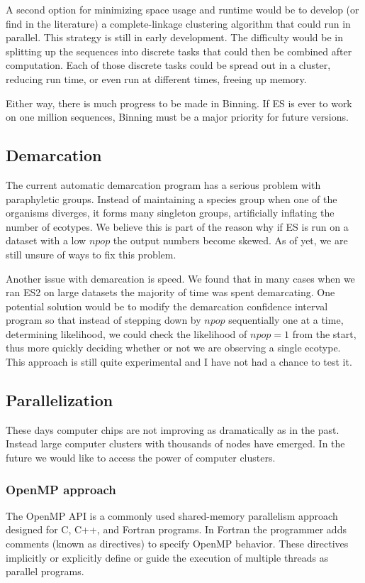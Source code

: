 A second option for minimizing space usage and runtime would be to develop (or find in the literature) a complete-linkage clustering algorithm that could run in parallel.
This strategy is still in early development.
The difficulty would be in splitting up the sequences into discrete tasks that could then be combined after computation.
Each of those discrete tasks could be spread out in a cluster, reducing run time, or even run at different times, freeing up memory.

Either way, there is much progress to be made in Binning.
If ES is ever to work on one million sequences, Binning must be a major priority for future versions.

\subsection*{Demarcation}
The current automatic demarcation program has a serious problem with paraphyletic groups.
Instead of maintaining a species group when one of the organisms diverges, it forms many singleton groups, artificially inflating the number of ecotypes.
We believe this is part of the reason why if ES is run on a dataset with a low $npop$ the output numbers become skewed.
As of yet, we are still unsure of ways to fix this problem.

Another issue with demarcation is speed.
We found that in many cases when we ran ES2 on large datasets the majority of time was spent demarcating.
One potential solution would be to modify the demarcation confidence interval program so that instead of stepping down by $npop$ sequentially one at a time, determining likelihood, we could check the likelihood of $npop = 1$ from the start, thus more quickly deciding whether or not we are observing a single ecotype.
This approach is still quite experimental and I have not had a chance to test it.

\subsection*{Parallelization}
These days computer chips are not improving as dramatically as in the past.
Instead large computer clusters with thousands of nodes have emerged.
In the future we would like to access the power of computer clusters.

\subsubsection*{OpenMP approach} %
The OpenMP API is a commonly used shared-memory parallelism approach designed for C, C++, and Fortran programs.
In Fortran the programmer adds comments (known as directives) to specify OpenMP behavior.
These directives implicitly or explicitly define or guide the execution of multiple threads as parallel programs.

